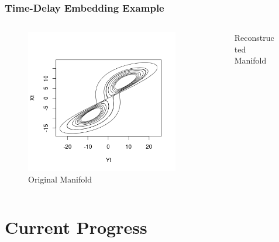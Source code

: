 \documentclass{beamer}
\begin{document}
\begin{frame}
\frametitle{Time-Delay Embedding Example}
 \begin{columns}[onlytextwidth]
   \begin{column}{0.5\textwidth}
\begin{figure}
\includegraphics[scale=.3]{XY} 
\caption{Original Manifold}
\end{figure} 
\end{column} 
 
\begin{column}{0.5\textwidth}
\vspace{-0.9cm}
\begin{figure}
\caption{Reconstructed Manifold}
\end{figure}
\end{column}

 \end{columns}
\end{frame}










\section{Current Progress}
\end{document}
